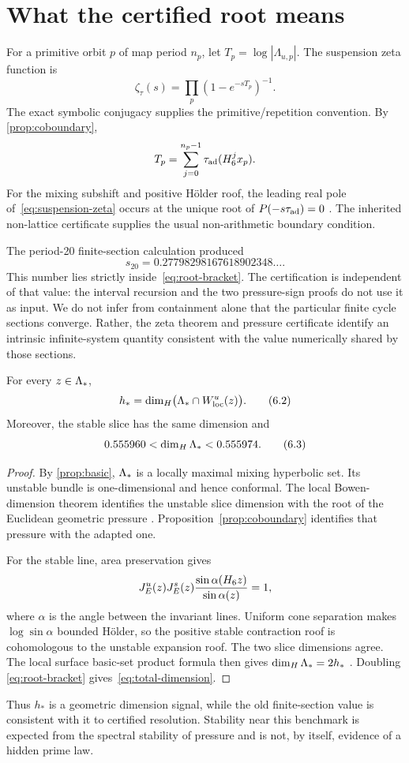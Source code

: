 \section{What the certified root means}
\label{sec:meaning}

For a primitive orbit \(p\) of map period \(n_p\), let
\(T_p=\log|\Lambda_{u,p}|\).  The suspension zeta function is
\[
 \zeta_\tau(s)
 =\prod_p\left(1-e^{-sT_p}\right)^{-1}.
 \tag{6.1}\label{eq:suspension-zeta}
\]
The exact symbolic conjugacy supplies the primitive/repetition convention.
By \cref{prop:coboundary},
\[
 T_p=\sum_{j=0}^{n_p-1}\tau_{\mathrm{ad}}(H_6^j x_p).
\]
For the mixing subshift and positive H\"older roof,
the leading real pole of~\eqref{eq:suspension-zeta} occurs at the unique root of
\(P(-s\tau_{\mathrm{ad}})=0\) \citep{ParryPollicott1990}.  The inherited non-lattice
certificate supplies the usual non-arithmetic boundary condition.

The period-20 finite-section calculation produced
\[
 s_{20}=0.27798298167618902348\ldots .
\]
This number lies strictly inside~\eqref{eq:root-bracket}.  The certification
is independent of that value: the interval recursion and the two pressure-sign
proofs do not use it as input.  We do not infer from containment alone that
the particular finite cycle sections converge.  Rather, the zeta theorem and
pressure certificate identify an intrinsic infinite-system quantity consistent
with the value numerically shared by those sections.

\begin{corollary}
\label{cor:dimension}
For every \(z\in\Lambda_*\),
\[
 h_*=\dim_H\bigl(\Lambda_*\cap W^u_{\mathrm{loc}}(z)\bigr).
 \tag{6.2}\label{eq:unstable-dimension}
\]
Moreover, the stable slice has the same dimension and
\[
 0.555960<\dim_H\Lambda_*<0.555974.
 \tag{6.3}\label{eq:total-dimension}
\]
\end{corollary}

\begin{proof}
By \cref{prop:basic}, \(\Lambda_*\) is a locally maximal mixing hyperbolic set.
Its unstable bundle is one-dimensional and hence conformal.  The local
Bowen-dimension theorem identifies the unstable slice dimension with the
root of the Euclidean geometric pressure
\citep[Remark~4.1]{PesinSadovskaya2001}.  Proposition~\ref{prop:coboundary}
identifies that pressure with the adapted one.

For the stable line, area preservation gives
\[
 J_E^u(z)J_E^s(z)
 \frac{\sin\alpha(H_6 z)}{\sin\alpha(z)}=1,
\]
where \(\alpha\) is the angle between the invariant lines.  Uniform cone
separation makes \(\log\sin\alpha\) bounded H\"older, so the positive stable
contraction roof is cohomologous to the unstable expansion roof.  The two
slice dimensions agree.  The local surface basic-set product formula then gives
\(\dim_H\Lambda_*=2h_*\) \citep[Theorem~1.2]{Barreira2013}.  Doubling
\eqref{eq:root-bracket} gives~\eqref{eq:total-dimension}.
\end{proof}

Thus \(h_*\) is a geometric dimension signal, while the old finite-section
value is consistent with it to certified resolution.  Stability near this
benchmark is expected from the spectral stability of pressure and is not, by
itself, evidence of a hidden prime law.

